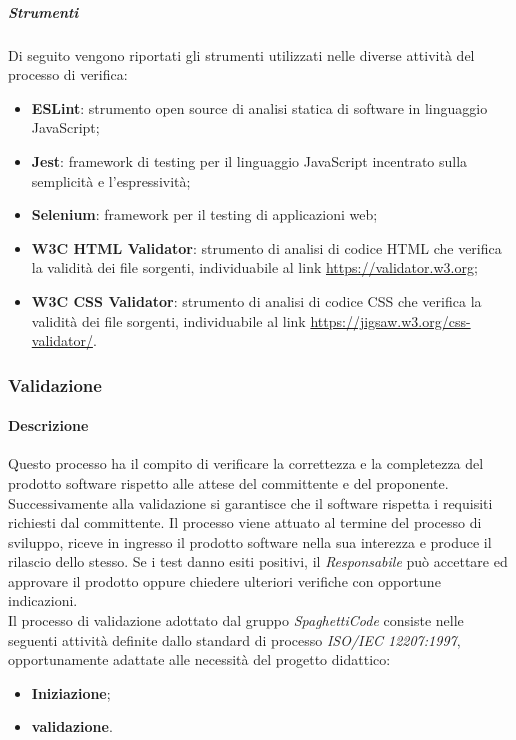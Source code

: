 \subparagraph{Strumenti}
\label{ssub:verifica:strumenti}

Di seguito vengono riportati gli strumenti utilizzati nelle diverse attività del processo di verifica:
\begin{itemize}
	\item \textbf{ESLint}: strumento open source di analisi statica di software in linguaggio JavaScript;
	\item \textbf{Jest}: framework di testing per il linguaggio JavaScript incentrato sulla semplicità e l'espressività;
	\item \textbf{Selenium}: framework per il testing di applicazioni web;
	\item \textbf{W3C HTML Validator}: strumento di analisi di codice HTML che verifica la validità dei file sorgenti, individuabile al
		link \url{https://validator.w3.org};
	\item \textbf{W3C CSS Validator}: strumento di analisi di codice CSS che verifica la validità dei file sorgenti, individuabile al
		link \url{https://jigsaw.w3.org/css-validator/}.
\end{itemize}

\subsubsection{Validazione}
\label{sub:validazione}

\paragraph{Descrizione}
\label{par:descrizione}

Questo processo ha il compito di verificare la correttezza e la completezza del prodotto software rispetto alle attese del committente e
del proponente. Successivamente alla validazione si garantisce che il software rispetta i requisiti richiesti dal committente.
Il processo viene attuato al termine del processo di sviluppo, riceve in ingresso il prodotto software nella sua interezza
e produce il rilascio dello stesso. Se i test danno esiti positivi, il \emph{Responsabile} può accettare ed approvare il prodotto oppure chiedere ulteriori verifiche con opportune indicazioni.\\

Il processo di validazione adottato dal gruppo \emph{SpaghettiCode} consiste nelle seguenti attività definite dallo standard di processo \emph{ISO/IEC 12207:1997}, opportunamente adattate alle necessità del progetto didattico:
\begin{itemize}
	\item \textbf{Iniziazione};
	\item \textbf{validazione}.
\end{itemize}

